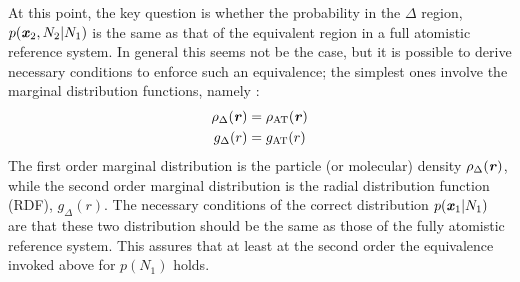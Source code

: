 \documentclass[aip,jcp,a4paper,reprint,onecolumn]{revtex4-1}
\newcommand{\vect}[1]{\textbf{\textit{#1}}}
\newcommand{\AT}{{\textrm{{AT}}}}
\newcommand{\HY}{{\Delta}}
\begin{document}
\noindent
At this point, the key question is whether the probability in the $\HY$ region, $p(\vect
x_2, N_2 | N_1)$ is the same as that of the equivalent region in a full atomistic reference
system. In general this seems not be the case, but it is possible to
derive necessary conditions to enforce such an equivalence; the simplest ones involve
the marginal distribution functions, namely \cite{rdfcorr}:
\begin{align}
  \rho_{\HY}(\vect r) &= \rho_{\AT}(\vect r)\\
  g_{\HY}( r) &= g_{\AT}(r)
\end{align}
The first order marginal distribution is the particle (or molecular) density 
$\rho_{\HY}(\vect r)$, while the second order marginal distribution is
the radial distribution function (RDF), $g_{\HY}(r)$. The necessary
conditions of the correct distribution $p(\vect x_1|N_1)$
are that these two distribution should be the same as those of the fully atomistic reference system. This assures that at least at the second order the equivalence invoked above for $p(N_{1})$ holds.
\end{document}
